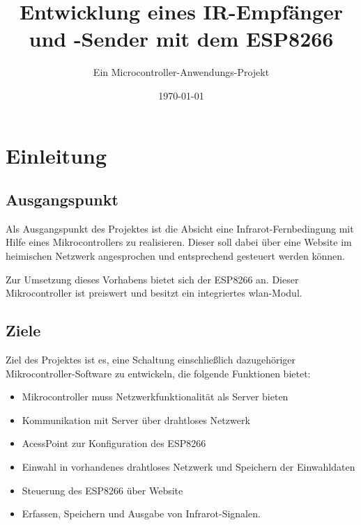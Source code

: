 						




\title{Entwicklung eines IR-Empfänger und -Sender mit dem ESP8266}
\subtitle{Ein Microcontroller-Anwendungs-Projekt}
\author{} %
\date{\today}

\maketitle

\tableofcontents										%
\pagebreak
\listoffigures											%
\pagebreak
\listoftables											%
\pagebreak

\section{Einleitung}
\subsection{Ausgangspunkt}
Als Ausgangspunkt des Projektes ist die Absicht eine Infrarot-Fernbedingung mit Hilfe eines Mikrocontrollers zu realisieren.
Dieser soll dabei über eine Website im heimischen Netzwerk angesprochen und entsprechend gesteuert werden können.

Zur Umsetzung dieses Vorhabens bietet sich der ESP8266 an.
Dieser Mikrocontroller ist preiswert und besitzt ein integriertes wlan-Modul.

\subsection{Ziele}
Ziel des Projektes ist es, eine Schaltung einschließlich dazugehöriger Mikrocontroller-Software zu entwickeln, die folgende Funktionen bietet:

\begin{itemize}
	\item Mikrocontroller muss Netzwerkfunktionalität als Server bieten
	\item Kommunikation mit Server über drahtloses Netzwerk
	\item AcessPoint zur Konfiguration des ESP8266
	\item Einwahl in vorhandenes drahtloses Netzwerk und Speichern der Einwahldaten
	\item Steuerung des ESP8266 über Website
	\item Erfassen, Speichern und Ausgabe von Infrarot-Signalen.
\end{itemize}


